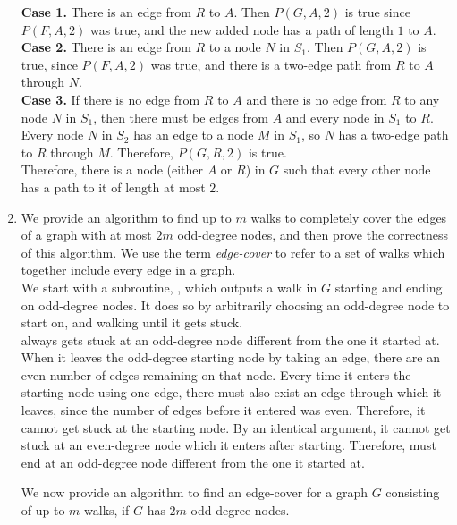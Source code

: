 \documentclass{article}
\begin{document}
\begin{enumerate}[label=(\alph*)]
    \textbf{Case 1.} There is an edge from $R$ to $A$. Then  $P(G, A, 2)$ is true since $P(F, A, 2)$ was true, and the new added node has a path of length $1$ to $A$.\\
    
    \textbf{Case 2.} There is an edge from $R$ to a node $N$ in $S_1$. Then $P(G, A, 2)$ is true, since $P(F, A, 2)$ was true, and there is a two-edge path from $R$ to $A$ through $N$.\\
    
    \textbf{Case 3.} If there is no edge from $R$ to $A$ and there is no edge from $R$ to any node $N$ in $S_1$, then there must be edges from $A$ and every node in $S_1$ to $R$. Every node $N$ in $S_2$ has an edge to a node $M$ in $S_1$, so $N$ has a two-edge path to $R$ through $M$. Therefore, $P(G, R, 2)$ is true.\\
    
    Therefore, there is a node (either $A$ or $R$) in $G$ such that every other node has a path to it of length at most $2$.
    
    \item We provide an algorithm to find up to $m$ walks to completely cover the edges of a graph with at most $2m$ odd-degree nodes, and then prove the correctness of this algorithm. We use the term \textit{edge-cover} to refer to a set of walks which together include every edge in a graph. \\
    
    We start with a subroutine, , which outputs a walk in $G$ starting and ending on odd-degree nodes. It does so by arbitrarily choosing an odd-degree node to start on, and walking until it gets stuck. \\
    
     always gets stuck at an odd-degree node different from the one it started at. When it leaves the odd-degree starting node by taking an edge, there are an even number of edges remaining on that node. Every time it enters the starting node using one edge, there must also exist an edge through which it leaves, since the number of edges before it entered was even. Therefore, it cannot get stuck at the starting node. By an identical argument, it cannot get stuck at an even-degree node which it enters after starting. Therefore,  must end at an odd-degree node different from the one it started at.
    
    We now provide an algorithm to find an edge-cover for a graph $G$ consisting of up to $m$ walks, if $G$ has $2m$ odd-degree nodes.
    

\end{enumerate}
\end{document}
